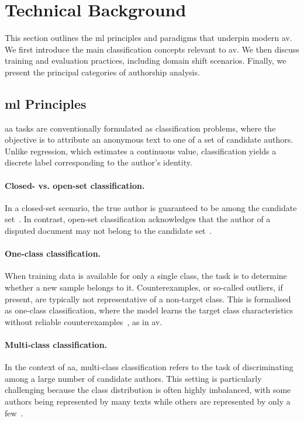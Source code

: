 \section{Technical Background}
\label{sec:technical_background}

This section outlines the \ac{ml} principles and paradigms that underpin modern \ac{av}. 
We first introduce the main classification concepts relevant to \ac{av}. 
We then discuss training and evaluation practices, including domain shift scenarios. 
Finally, we present the principal categories of authorship analysis.

\subsection{\acl{ml} Principles}

\ac{aa} tasks are conventionally formulated as classification problems, where the objective is to attribute an anonymous text to one of a set of candidate authors. 
Unlike regression, which estimates a continuous value, classification yields a discrete label corresponding to the author’s identity.

\paragraph{Closed- vs. open-set classification.} 
In a closed-set scenario, the true author is guaranteed to be among the candidate set~\citep{koppel_authorship_2011}. 
In contrast, open-set classification acknowledges that the author of a disputed document may not belong to the candidate set~\citep{stamatatos_survey_2009}. 

\paragraph{One-class classification.} 
When training data is available for only a single class, the task is to determine whether a new sample belongs to it. 
Counterexamples, or so-called outliers, if present, are typically not representative of a non-target class. 
This is formalised as one-class classification, where the model learns the target class characteristics without reliable counterexamples~\citep{stein_intrinsic_2011,koppel_authorship_2004}, as in \ac{av}.

\paragraph{Multi-class classification.} 
In the context of \ac{aa}, multi-class classification refers to the task of discriminating among a large number of candidate authors. 
This setting is particularly challenging because the class distribution is often highly imbalanced, with some authors being represented by many texts while others are represented by only a few~\citep{stamatatos_survey_2009,koppel_authorship_2004}. 


